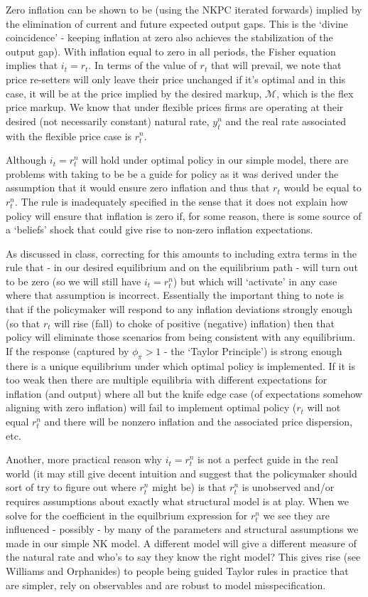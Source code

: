 \documentclass[authoryear,11pt]{elsarticle}
\begin{document}
Zero inflation can be shown to be (using the NKPC iterated forwards) implied by the elimination of current and future expected output gaps. This is the `divine coincidence' - keeping inflation at zero also achieves the stabilization of the output gap). With inflation equal to zero in all periods, the Fisher equation implies that $i_{t}=r_{t}$. In terms of the value of $r_{t}$ that will prevail, we note that price re-setters will only leave their price unchanged if it's optimal and in this case, it will be at the price implied by the desired markup, $\mathcal{M}$, which is the flex price markup. We know that under flexible prices firms are operating at their desired (not necessarily constant) natural rate, $y_{t}^{n}$ and the real rate associated with the flexible price case is $r^{n}_{t}$.

Although $i_{t}=r^{n}_{t}$ will hold under optimal policy in our simple model, there are problems with taking to be be a guide for policy as it was derived under the assumption that it would ensure zero inflation and thus that $r_{t}$ would be equal to $r^{n}_{t}$. The rule is inadequately specified in the sense that it does not explain how policy will ensure that inflation is zero if, for some reason, there is some source of a `beliefs' shock that could give rise to non-zero inflation expectations.

As discussed in class, correcting for this amounts to including extra terms in the rule that - in our desired equilibrium and on the equilibrium path - will turn out to be zero (so we will still have $i_{t}=r^{n}_{t}$) but which will `activate' in any case where that assumption is incorrect. Essentially the important thing to note is that if the policymaker will respond to any inflation deviations strongly enough (so that $r_{t}$ will  rise (fall) to choke of positive (negative) inflation) then that policy will eliminate those scenarios from being consistent with any equilibrium. If the response (captured by $\phi_{\pi}>1$ - the `Taylor Principle') is strong enough there is a unique equilibrium under which optimal policy is implemented. If it is too weak then there are multiple equilibria with different expectations for inflation (and output) where all but the knife edge case (of expectations somehow aligning with zero inflation) will fail to implement optimal policy ($r_{t}$ will not equal $r^{n}_{t}$ and there will be nonzero inflation and the associated price dispersion, etc.

Another, more practical reason why $i_{t}=r^{n}_{t}$ is not a perfect guide in the real world (it may still give decent intuition and suggest that the policymaker should sort of try to figure out where $r_{t}^{n}$ might be) is that $r_{t}^{n}$ is unobserved and/or requires assumptions about exactly what structural model is at play. When we solve for the coefficient in the equilbrium expression for $r_{t}^{n}$ we see they are influenced - possibly - by many of the parameters and structural assumptions we made in our simple NK model. A different model will give a different measure of the natural rate and who's to say they know the right model? This gives rise (see Williams and Orphanides) to people being guided Taylor rules in practice that are simpler, rely on observables and are robust to model misspecification.
\end{document}

